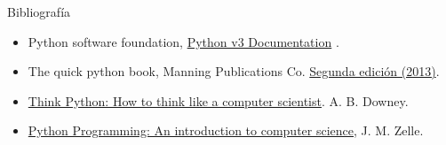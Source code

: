 \documentclass{beamer}
\begin{document}
    \begin{frame}{Bibliografía}
        \begin{itemize}
            \item Python software foundation, \href{http://docs.python.org/3/}{Python v3 Documentation} .
            \item The quick python book, Manning Publications Co. \href{https://www.manning.com/books/the-quick-python-book}{Segunda edición (2013)}.
            \item \href{https://greenteapress.com/thinkpython/}{Think Python: How to think like a computer scientist}. A. B. Downey.
            \item \href{https://www.krishnagudi.com/wp-content/uploads/2023/05/Python-Programming-An-Introduction-to-Computer-Science-John-M.-Zelle.pdf}
            {Python Programming: An introduction to computer science}, J. M. Zelle.
        \end{itemize}
    \end{frame}

\end{document}
